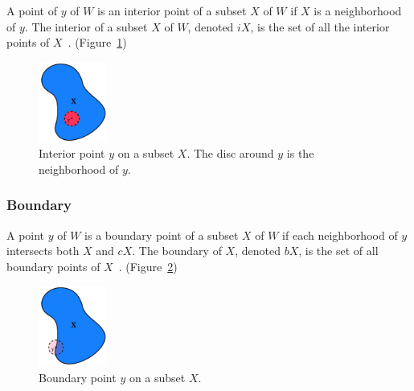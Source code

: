 \documentclass[a4paper,11pt,oneside]{article}
\begin{document}
\begin{definition}
	A point of $y$ of $W$ is an interior point of a subset $X$ of $W$ if $X$ is a neighborhood of $y$. The interior of a subset $X$ of $W$, denoted $iX$, is the set of all the interior points of $X$~\cite{Requicha1978MathematicalFO}. (Figure~\ref{sec3.2:interior-neighborhood})
\end{definition}
    

\begin{figure}[ht]
	\begin{center}
		\includegraphics[width=0.2\textwidth]{section3/3.2/interior.png}
	\end{center}
	\caption{Interior point $y$ on a subset $X$. The disc around $y$ is the neighborhood of $y$.}
	\label{sec3.2:interior-neighborhood}
\end{figure}

\subsubsection{Boundary}
    
\begin{definition}
	A point $y$ of $W$ is a boundary point of a subset $X$ of $W$ if each neighborhood of $y$ intersects both $X$ and $cX$. The boundary of $X$, denoted $bX$, is the set of all boundary points of $X$~\cite{Requicha1978MathematicalFO}. (Figure~\ref{sec3.2:boundary})
\end{definition}
    
\begin{figure}[ht]
	\begin{center}
		\includegraphics[width=0.2\textwidth]{section3/3.2/boundary.png}
	\end{center}
	\caption{Boundary point $y$ on a subset $X$.}
	\label{sec3.2:boundary}
\end{figure}
    
\end{document}
